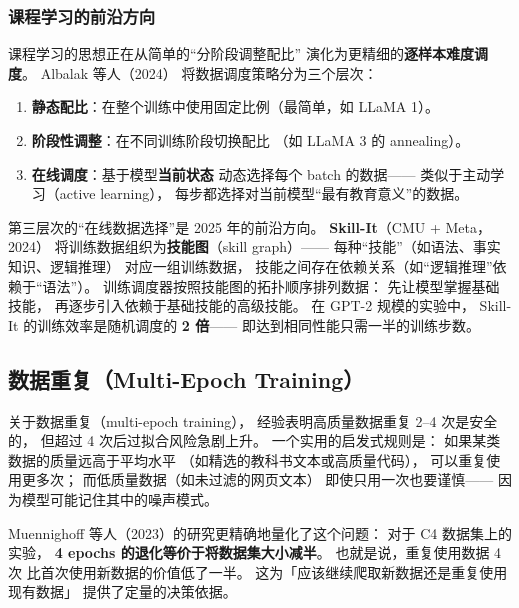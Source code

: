 \subsubsection{课程学习的前沿方向}

课程学习的思想正在从简单的``分阶段调整配比''
演化为更精细的\textbf{逐样本难度调度}。
Albalak 等人（2024）%
将数据调度策略分为三个层次：
\begin{enumerate}[noitemsep]
  \item \textbf{静态配比}：在整个训练中使用固定比例（最简单，如 LLaMA 1）。
  \item \textbf{阶段性调整}：在不同训练阶段切换配比
        （如 LLaMA 3 的 annealing）。
  \item \textbf{在线调度}：基于模型\textbf{当前状态}
        动态选择每个 batch 的数据——
        类似于主动学习（active learning），
        每步都选择对当前模型``最有教育意义''的数据。
\end{enumerate}

第三层次的``在线数据选择''是 2025 年的前沿方向。
\textbf{Skill-It}（CMU + Meta，2024）%
将训练数据组织为\textbf{技能图}（skill graph）——
每种``技能''（如语法、事实知识、逻辑推理）
对应一组训练数据，
技能之间存在依赖关系（如``逻辑推理''依赖于``语法''）。
训练调度器按照技能图的拓扑顺序排列数据：
先让模型掌握基础技能，
再逐步引入依赖于基础技能的高级技能。
在 GPT-2 规模的实验中，
Skill-It 的训练效率是随机调度的 \textbf{2 倍}——
即达到相同性能只需一半的训练步数。

\subsection{数据重复（Multi-Epoch Training）}

关于数据重复（multi-epoch training），
经验表明高质量数据重复 2--4 次是安全的，
但超过 4 次后过拟合风险急剧上升。
一个实用的启发式规则是：
如果某类数据的质量远高于平均水平
（如精选的教科书文本或高质量代码），
可以重复使用更多次；
而低质量数据（如未过滤的网页文本）
即使只用一次也要谨慎——
因为模型可能记住其中的噪声模式。

Muennighoff 等人（2023）的研究更精确地量化了这个问题：
对于 C4 数据集上的实验，
\textbf{4 epochs 的退化等价于将数据集大小减半}。
也就是说，重复使用数据 4 次
比首次使用新数据的价值低了一半。
这为「应该继续爬取新数据还是重复使用现有数据」
提供了定量的决策依据。

